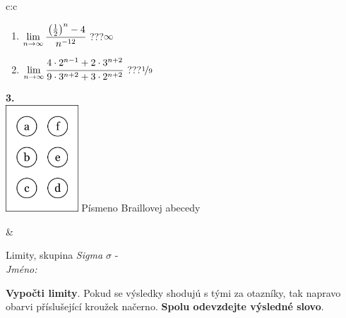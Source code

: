 \documentclass[10pt]{report}
\begin{document}
\begin{tabular}{c:c}
\begin{minipage}[c][104.5mm][t]{0.5\linewidth}
\begin{center}
\begin{minipage}{0.79\linewidth}
\begin{center}
\begin{varwidth}{\linewidth}
\begin{enumerate}
\item $\lim\limits_{n\to\infty}\cfrac{\left(\frac{1}{2}\right)^n -4}{n^{-12}}$\quad \dotfill\; ???\;\dotfill \quad $\infty$
\item $\lim\limits_{n\to\infty}\cfrac{4\cdot 2^{n-1}+2\cdot 3^{n+2}}{9\cdot 3^{n+2}+3\cdot 2^{n+2}}$\quad \dotfill\; ???\;\dotfill \quad $\nicefrac{1}{9}$
\end{enumerate}
\end{varwidth}
\end{center}
\end{minipage}
\begin{minipage}{0.20\linewidth}
\begin{center}
{\Huge\bfseries 3.} \\[2mm]
\includegraphics[height=40mm]{../images/braille.png}
{\small Písmeno Braillovej abecedy}
\end{center}
\end{minipage}
\end{center}
\end{minipage}
&
\begin{minipage}[c][104.5mm][t]{0.5\linewidth}
\begin{center}
\vspace{7mm}
{\huge Limity, skupina \textit{Sigma $\sigma$} -}\\[5mm]
\textit{Jméno:}\phantom{xxxxxxxxxxxxxxxxxxxxxxxxxxxxxxxxxxxxxxxxxxxxxxxxxxxxxxxxxxxxxxxxx}\\[5mm]
\begin{minipage}{0.95\linewidth}
\begin{center}
\textbf{Vypočti limity}. Pokud se výsledky shodujú s tými za otazníky, tak napravo\\obarvi příslušející kroužek načerno. \textbf{Spolu odevzdejte výsledné slovo}.
\end{center}
\end{minipage}
\\[1mm]
\begin{minipage}{0.79\linewidth}
\begin{center}
\begin{varwidth}{\linewidth}

\end{varwidth}
\end{center}
\end{minipage}
\end{center}
\end{minipage}
\end{tabular}
\end{document}
